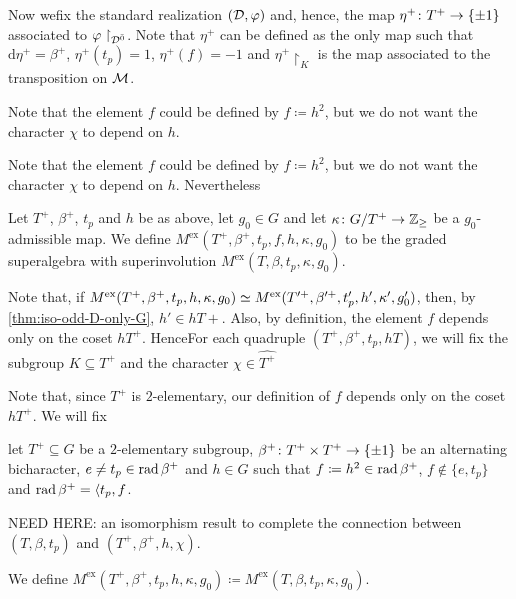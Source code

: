 Now wefix the standard realization $(\mathcal{D}, \varphi)$ and, hence, the map $\eta^+ \colon T^+ \to \{ \pm 1 \}$ associated to $\varphi\restriction_{\mathcal{D}^{\bar0}}$. 
Note that $\eta^+$ can be defined as the only map such that $\mathrm{d}\eta^+ = \beta^+$, $\eta^+(t_p) = 1$, $\eta^+(f) = -1$ and $\eta^+\restriction_{K}$ is the map associated to the transposition on $\mathcal M$. 


\begin{remark}
    Note that the element $f$ could be defined by $f \coloneqq h^2$, but we do not want the character $\chi$ to depend on $h$. 
\end{remark}




\begin{remark}
    Note that the element $f$ could be defined by $f \coloneqq h^2$, but we do not want the character $\chi$ to depend on $h$. 
    Nevertheless
\end{remark}

\begin{defi}
    Let $T^+$, $\beta^+$, $t_p$ and $h$ be as above, let $g_0 \in G$ and let $\kappa\colon G/T^+ \to \mathbb{Z}_{\geq}$ be a $g_0$-admissible map. 
    We define $M^{\mathrm{ex}}(T^+, \beta^+, t_p, f, h, \kappa, g_0)$ to be the graded superalgebra with superinvolution $M^{\mathrm{ex}}(T, \beta, t_p, \kappa, g_0)$. 
\end{defi}

Note that, if $M^{\mathrm{ex}}(T^+, \beta^+, t_p, h, \kappa, g_0) \simeq M^{\mathrm{ex}}(T'^+, \beta'^+, t_p', h', \kappa', g_0')$, then, by \cref{thm:iso-odd-D-only-G}, $h' \in h T+$. 
Also, by definition, the element $f$ depends only on the coset $hT^+$. 
HenceFor each quadruple $(T^+, \beta^+, t_p, hT)$, we will fix the subgroup $K \subseteq T^+$ and the character $\chi \in \widehat{T^+}$

Note that, since $T^+$ is $2$-elementary, our definition of $f$ depends only on the coset $hT^+$. 
We will fix

let $T^+ \subseteq G$ be a $2$-elementary subgroup, $\beta^+\colon T^+ \times T^+ \to \{ \pm 1 \}$ be an alternating bicharacter, $e \neq t_p \in \operatorname{rad} \beta^+$ and $h\in G$ such that $f\coloneqq h^2 \in \operatorname{rad} \beta^+$, $f \not\in \{e, t_p \}$ and $\operatorname{rad} \beta^+ = \langle t_p, f$.

NEED HERE: an isomorphism result to complete the connection between $(T, \beta, t_p)$ and $(T^+, \beta^+, h, \chi)$. 



We define $M^{\mathrm{ex}}(T^+, \beta^+, t_p, h, \kappa, g_0) \coloneqq M^{\mathrm{ex}}(T, \beta, t_p, \kappa, g_0)$. 

